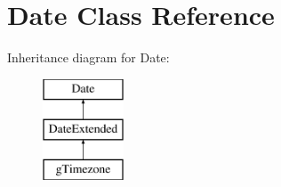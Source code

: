 \hypertarget{class_date}{\section{Date Class Reference}
\label{class_date}
}
Inheritance diagram for Date\-:\begin{figure}[H]
\begin{center}
\leavevmode
\includegraphics[height=3.000000cm]{class_date}
\end{center}
\end{figure}
